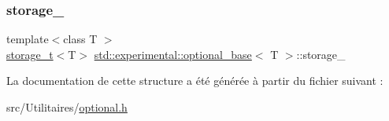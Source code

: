 \subsubsection{\texorpdfstring{storage\+\_\+}{storage\_}}
{\footnotesize\ttfamily template$<$class T $>$ \\
\hyperlink{unionstd_1_1experimental_1_1storage__t}{storage\+\_\+t}$<$T$>$ \hyperlink{structstd_1_1experimental_1_1optional__base}{std\+::experimental\+::optional\+\_\+base}$<$ T $>$\+::storage\+\_\+}



La documentation de cette structure a été générée à partir du fichier suivant \+:\begin{DoxyCompactItemize}
\item 
src/\+Utilitaires/\hyperlink{optional_8h}{optional.\+h}\end{DoxyCompactItemize}
